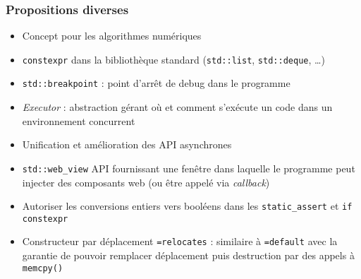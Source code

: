 \documentclass[C++.tex]{subfiles}
\begin{document}
\begin{frame}[fragile]
	\frametitle{Propositions diverses}
	\begin{itemize}
		\item Concept pour les algorithmes numériques
		\item \lstinline|constexpr| dans la bibliothèque standard (\lstinline|std::list|, \lstinline|std::deque|, \ldots)


		\item \lstinline|std::breakpoint| : point d'arrêt de debug dans le programme
		\item \textit{Executor} : abstraction gérant où et comment s'exécute un code dans un environnement concurrent
		\item Unification et amélioration des API asynchrones


		\item \lstinline|std::web_view| API fournissant une fenêtre dans laquelle le programme peut injecter des composants web (ou être appelé via \textit{callback})
		\item Autoriser les conversions entiers vers booléens dans les \lstinline|static_assert| et \lstinline|if constexpr|
		\item Constructeur par déplacement \lstinline|=relocates| : similaire à \lstinline|=default| avec la garantie de pouvoir remplacer \og déplacement puis destruction\fg{} par des appels à \lstinline|memcpy() |


	\end{itemize}
\end{frame}
\end{document}
